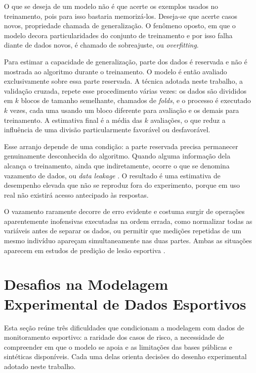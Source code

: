 O que se deseja de um modelo não é que acerte os exemplos usados no treinamento, pois para isso bastaria memorizá-los. Deseja-se que acerte casos novos, propriedade chamada de generalização. O fenômeno oposto, em que o modelo decora particularidades do conjunto de treinamento e por isso falha diante de dados novos, é chamado de sobreajuste, ou \textit{overfitting}.

Para estimar a capacidade de generalização, parte dos dados é reservada e não é mostrada ao algoritmo durante o treinamento. O modelo é então avaliado exclusivamente sobre essa parte reservada. A técnica adotada neste trabalho, a validação cruzada, repete esse procedimento várias vezes: os dados são divididos em $k$ blocos de tamanho semelhante, chamados de \textit{folds}, e o processo é executado $k$ vezes, cada uma usando um bloco diferente para avaliação e os demais para treinamento. A estimativa final é a média das $k$ avaliações, o que reduz a influência de uma divisão particularmente favorável ou desfavorável.

Esse arranjo depende de uma condição: a parte reservada precisa permanecer genuinamente desconhecida do algoritmo. Quando alguma informação dela alcança o treinamento, ainda que indiretamente, ocorre o que se denomina vazamento de dados, ou \textit{data leakage} \cite{kaufman2012}. O resultado é uma estimativa de desempenho elevada que não se reproduz fora do experimento, porque em uso real não existirá acesso antecipado às respostas.

O vazamento raramente decorre de erro evidente e costuma surgir de operações aparentemente inofensivas executadas na ordem errada, como normalizar todas as variáveis antes de separar os dados, ou permitir que medições repetidas de um mesmo indivíduo apareçam simultaneamente nas duas partes. Ambas as situações aparecem em estudos de predição de lesão esportiva \cite{vaneetvelde2021}.

\section{Desafios na Modelagem Experimental de Dados Esportivos}

Esta seção reúne três dificuldades que condicionam a modelagem com dados de monitoramento esportivo: a raridade dos casos de risco, a necessidade de compreender em que o modelo se apoia e as limitações das bases públicas e sintéticas disponíveis. Cada uma delas orienta decisões do desenho experimental adotado neste trabalho.

